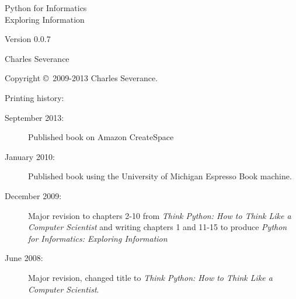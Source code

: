 \documentclass[11pt]{book}
\newcommand{\theversion}{0.0.7}
\begin{document}
\frontmatter




\newtheorem{ex}{Exercise}[chapter]

\begin{latexonly}

\renewcommand{\blankpage}{\thispagestyle{empty} \quad \newpage}

\thispagestyle{empty}

\begin{flushright}
\vspace*{2.0in}

\begin{spacing}{3}
{\huge Python for Informatics}\\
{\Large Exploring Information}
\end{spacing}

\vspace{0.25in}

Version \theversion

\vspace{0.5in}


{\Large
Charles Severance\\
}

\vfill

\end{flushright}

\pagebreak
\thispagestyle{empty}

{\small
Copyright \copyright ~2009-2013 Charles Severance.


Printing history:

\begin{description}

\item[September 2013:] Published book on Amazon CreateSpace

\item[January 2010:] Published book using the University of 
Michigan Espresso Book machine.

\item[December 2009:] Major revision to chapters 2-10 from
\emph{Think Python: How to Think Like
a Computer Scientist}
and writing chapters 1 and 11-15 to
produce 
\emph{Python for Informatics: Exploring Information}

\item[June 2008:] Major revision, changed title to
\emph{Think Python: How to Think Like
a Computer Scientist}.


\end{description}}
\end{latexonly}
\end{document}
